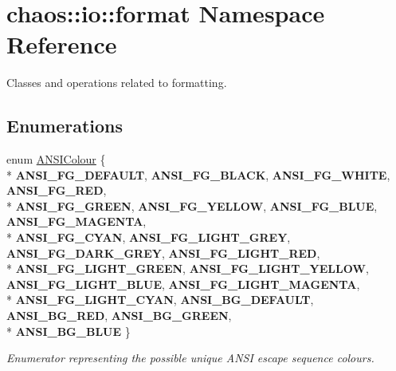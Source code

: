 \hypertarget{namespacechaos_1_1io_1_1format}{\section{chaos\-:\-:io\-:\-:format Namespace Reference}
\label{namespacechaos_1_1io_1_1format}
}


Classes and operations related to formatting.  


\subsection*{Enumerations}
\begin{DoxyCompactItemize}
\item 
enum \hyperlink{namespacechaos_1_1io_1_1format_aa30dcff2478ffc94e33504c8886a5b1a}{A\-N\-S\-I\-Colour} \{ \\*
{\bfseries A\-N\-S\-I\-\_\-\-F\-G\-\_\-\-D\-E\-F\-A\-U\-L\-T}, 
{\bfseries A\-N\-S\-I\-\_\-\-F\-G\-\_\-\-B\-L\-A\-C\-K}, 
{\bfseries A\-N\-S\-I\-\_\-\-F\-G\-\_\-\-W\-H\-I\-T\-E}, 
{\bfseries A\-N\-S\-I\-\_\-\-F\-G\-\_\-\-R\-E\-D}, 
\\*
{\bfseries A\-N\-S\-I\-\_\-\-F\-G\-\_\-\-G\-R\-E\-E\-N}, 
{\bfseries A\-N\-S\-I\-\_\-\-F\-G\-\_\-\-Y\-E\-L\-L\-O\-W}, 
{\bfseries A\-N\-S\-I\-\_\-\-F\-G\-\_\-\-B\-L\-U\-E}, 
{\bfseries A\-N\-S\-I\-\_\-\-F\-G\-\_\-\-M\-A\-G\-E\-N\-T\-A}, 
\\*
{\bfseries A\-N\-S\-I\-\_\-\-F\-G\-\_\-\-C\-Y\-A\-N}, 
{\bfseries A\-N\-S\-I\-\_\-\-F\-G\-\_\-\-L\-I\-G\-H\-T\-\_\-\-G\-R\-E\-Y}, 
{\bfseries A\-N\-S\-I\-\_\-\-F\-G\-\_\-\-D\-A\-R\-K\-\_\-\-G\-R\-E\-Y}, 
{\bfseries A\-N\-S\-I\-\_\-\-F\-G\-\_\-\-L\-I\-G\-H\-T\-\_\-\-R\-E\-D}, 
\\*
{\bfseries A\-N\-S\-I\-\_\-\-F\-G\-\_\-\-L\-I\-G\-H\-T\-\_\-\-G\-R\-E\-E\-N}, 
{\bfseries A\-N\-S\-I\-\_\-\-F\-G\-\_\-\-L\-I\-G\-H\-T\-\_\-\-Y\-E\-L\-L\-O\-W}, 
{\bfseries A\-N\-S\-I\-\_\-\-F\-G\-\_\-\-L\-I\-G\-H\-T\-\_\-\-B\-L\-U\-E}, 
{\bfseries A\-N\-S\-I\-\_\-\-F\-G\-\_\-\-L\-I\-G\-H\-T\-\_\-\-M\-A\-G\-E\-N\-T\-A}, 
\\*
{\bfseries A\-N\-S\-I\-\_\-\-F\-G\-\_\-\-L\-I\-G\-H\-T\-\_\-\-C\-Y\-A\-N}, 
{\bfseries A\-N\-S\-I\-\_\-\-B\-G\-\_\-\-D\-E\-F\-A\-U\-L\-T}, 
{\bfseries A\-N\-S\-I\-\_\-\-B\-G\-\_\-\-R\-E\-D}, 
{\bfseries A\-N\-S\-I\-\_\-\-B\-G\-\_\-\-G\-R\-E\-E\-N}, 
\\*
{\bfseries A\-N\-S\-I\-\_\-\-B\-G\-\_\-\-B\-L\-U\-E}
 \}
\begin{DoxyCompactList}\small\item\em Enumerator representing the possible unique A\-N\-S\-I escape sequence colours. \end{DoxyCompactList}\item 

\end{DoxyCompactItemize}
